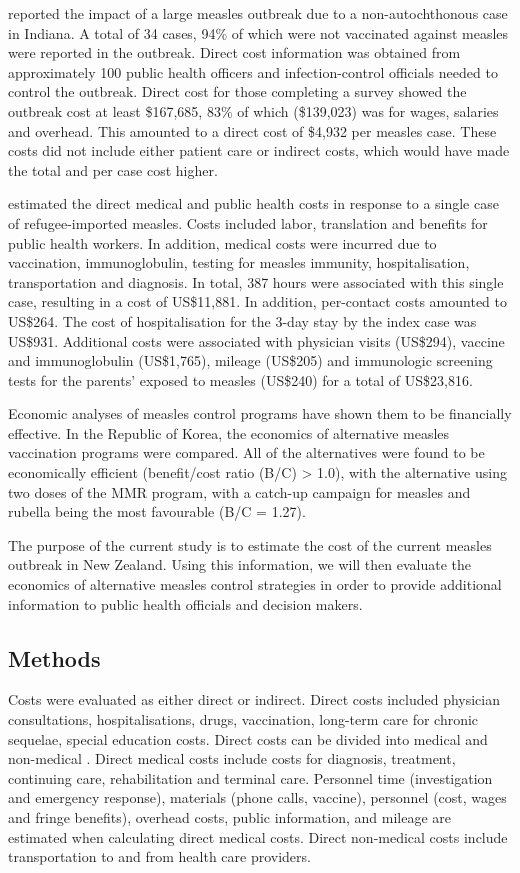 \documentclass{article}
\begin{document}
{\citep{parker6} reported the impact of a large measles outbreak due to a non-autochthonous case in Indiana. A total of 34 cases, 94\% of which were not vaccinated against measles were reported in the outbreak. Direct cost information was obtained from approximately 100 public health officers and infection-control officials needed to control the outbreak. Direct cost for those completing a survey showed the outbreak cost at least \$167,685, 83\% of which (\$139,023) was for wages, salaries and overhead. This amounted to a direct cost of \$4,932 per measles case. These costs did not include either patient care or indirect costs, which would have made the total and per case cost higher.

\citep{coleman12} estimated the direct medical and public health costs in response to a single case of refugee-imported measles.  Costs included labor, translation and benefits for public health workers. In addition, medical costs were incurred due to vaccination, immunoglobulin, testing for measles immunity, hospitalisation, transportation and diagnosis. In total, 387 hours were associated with this single case, resulting in a cost of US\$11,881. In addition, per-contact costs amounted to US\$264. The cost of hospitalisation for the 3-day stay by the index case was US\$931. Additional costs were associated with physician visits (US\$294), vaccine and immunoglobulin (US\$1,765), mileage (US\$205) and immunologic screening tests for the parents' exposed to measles (US\$240) for a total of US\$23,816.

Economic analyses of measles control programs have shown them to be financially effective. In the Republic of Korea, the economics of alternative measles vaccination programs were compared. All of the alternatives were found to be economically efficient (benefit/cost ratio (B/C) > 1.0), with the alternative using two doses of the MMR program, with a catch-up campaign for measles and rubella being the most favourable (B/C = 1.27).

The purpose of the current study is to estimate the cost of the current measles outbreak in New Zealand. Using this information, we will then evaluate the economics of alternative measles control strategies in order to provide additional information to public health officials and decision makers.

\subsection{Methods}
Costs were evaluated as either direct or indirect. Direct costs included physician consultations, hospitalisations, drugs, vaccination, long-term care for chronic sequelae, special education costs. Direct costs can be divided into medical and non-medical \citep{saha13}. Direct medical costs include costs for diagnosis, treatment, continuing care, rehabilitation and terminal care. Personnel time (investigation and emergency response), materials (phone calls, vaccine), personnel (cost, wages and fringe benefits), overhead costs, public information, and mileage are estimated when calculating direct medical costs. Direct non-medical costs include transportation to and from health care providers.

}
\end{document}

